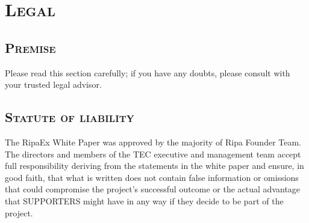 \documentclass[11pt,fleqn,oneside]{book} %
\begin{document}
\chapter{\textsc{Legal}}
\begin{scriptsize}
	{\scshape
		\section{\textsc{Premise}}
		Please read this section carefully; if you have any doubts,
		please consult with your trusted legal advisor.
		\section{\textsc{Statute of liability}} 
		The RipaEx White Paper was approved by the majority of Ripa Founder Team.
		The directors and members of the TEC executive and
		management team accept full responsibility deriving
		from the statements in the white paper and ensure, in
		good faith, that what is written does not contain false
		information or omissions that could compromise the
		project’s successful outcome or the actual advantage that
		SUPPORTERS might have in any way if they decide to be
		part of the project.
}
\end{scriptsize}
\end{document}
